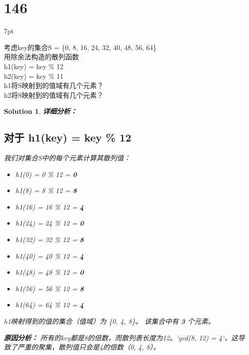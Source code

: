 \documentclass[UTF8]{report}
\newtheorem{solution}{Solution}
\theoremstyle{MyLineTheoremStyle} %
\theoremstyle{MyBlockTheoremStyle} %
\theoremstyle{MySubsubsectionStyle} %
\newenvironment{graybox}{%
        \def\FrameCommand{%
        \hspace{1pt}%
        {\color{gray}\small \vrule width 2pt}%
        {\color{graybox_color}\vrule width 4pt}%
        \colorbox{graybox_color}%
        }%
        \MakeFramed{\advance\hsize-\width\FrameRestore}%
        \noindent\hspace{-4.55pt}%
        \begin{adjustwidth}{}{7pt}%
        \vspace{2pt}\vspace{2pt}%
        }
        {%
        \vspace{2pt}\end{adjustwidth}\endMakeFramed%
        }
\begin{document}
\section*{146}
\begin{graybox}
考虑key的集合S = \{0, 8, 16, 24, 32, 40, 48, 56, 64\}\\
用除余法构造的散列函数\\
h1(key) = key \% 12\\
h2(key) = key \% 11\\
h1将S映射到的值域有几个元素？
\underline{\hspace{2cm}}\\
h2将S映射到的值域有几个元素？
\underline{\hspace{2cm}}
\end{graybox}

\begin{solution}
\textbf{详细分析：}

\subsection*{对于 h1(key) = key \% 12}
我们对集合S中的每个元素计算其散列值：
\begin{itemize}
    \item h1(0) = 0 \% 12 = \textbf{0}
    \item h1(8) = 8 \% 12 = \textbf{8}
    \item h1(16) = 16 \% 12 = \textbf{4}
    \item h1(24) = 24 \% 12 = \textbf{0}
    \item h1(32) = 32 \% 12 = \textbf{8}
    \item h1(40) = 40 \% 12 = \textbf{4}
    \item h1(48) = 48 \% 12 = \textbf{0}
    \item h1(56) = 56 \% 12 = \textbf{8}
    \item h1(64) = 64 \% 12 = \textbf{4}
\end{itemize}
h1映射得到的值的集合（值域）为 \{0, 4, 8\}。
该集合中有 \textbf{3} 个元素。

\textbf{原因分析：} 所有的key都是8的倍数，而散列表长度为12。`gcd(8, 12) = 4`，这导致了严重的聚集，散列值只会是4的倍数（0, 4, 8）。



\end{solution}
\end{document}
